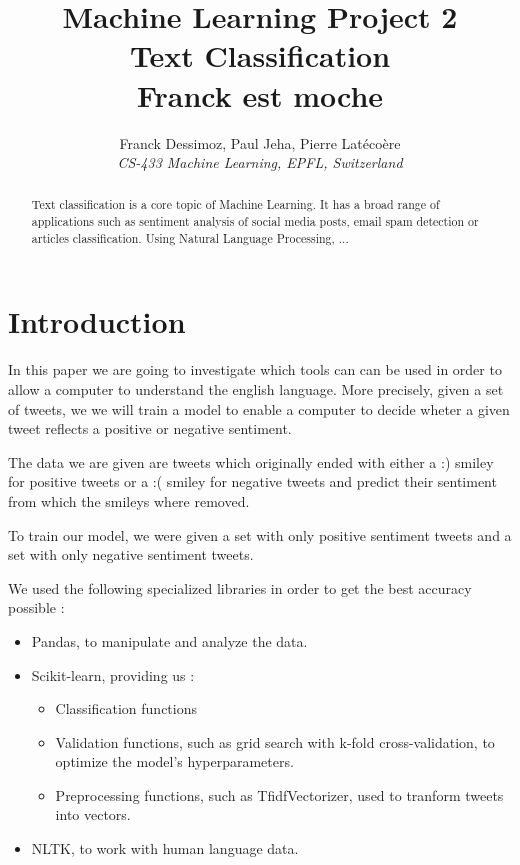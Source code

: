 \documentclass[10pt,conference,compsocconf]{IEEEtran}
\begin{document}
\title{Machine Learning Project 2\\Text Classification\\Franck est moche}

\author{
  Franck Dessimoz, Paul Jeha, Pierre Lat\'{e}co\`{e}re\\
  \textit{CS-433 Machine Learning, EPFL, Switzerland}
}

\maketitle

\renewcommand{\arraystretch}{1.3}

\begin{abstract}
Text classification is a core topic of Machine Learning. It has a broad range of applications such as sentiment analysis of social media posts, email spam detection or articles classification.
Using Natural Language Processing, ...
\end{abstract}

\section{Introduction}
In this paper we are going to investigate which tools can can be used in order to allow a computer to understand the english language. More precisely, given a set of tweets, we we will train a model to enable a computer to decide wheter a given tweet reflects a positive or negative sentiment.

The data we are given are tweets which originally ended with either a :) smiley for positive tweets or a :( smiley for negative tweets and predict their sentiment from which the smileys where removed.

To train our model, we were given a set with only positive sentiment tweets and a set with only negative sentiment tweets.

We used the following specialized libraries in order to get the best accuracy possible :
\begin{itemize}
\item Pandas, to manipulate and analyze the data.
\item Scikit-learn, providing us :
\begin{itemize}
  \item Classification functions
  \item Validation functions, such as grid search with k-fold cross-validation, to optimize the model's hyperparameters.
  \item Preprocessing functions, such as TfidfVectorizer, used to tranform tweets into vectors. 
\end{itemize}
\item NLTK, to work with human language data.
\end{itemize}
\end{document}
